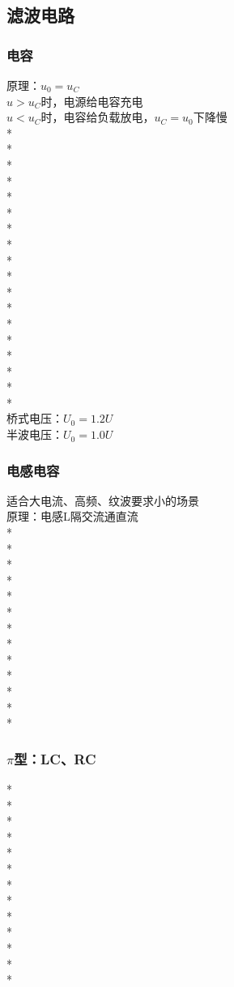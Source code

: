 \documentclass[UTF8, fontset=none]{ctexart}
\begin{document}
\begin{multicols*}{8}
\subsection{滤波电路}
\subsubsection{电容}
原理：$u_0 = u_C$\\
$u > u_C$时，电源给电容充电\\
$u < u_C$时，电容给负载放电，$u_C = u_0$下降慢\\
*\\
*\\
*\\
*\\
*\\
*\\
*\\
*\\
*\\
*\\
*\\
*\\
*\\
*\\
*\\
*\\
*\\
*\\
桥式电压：$U_0 = 1.2U$\\
半波电压：$U_0 = 1.0U$\\
\subsubsection{电感电容}
适合大电流、高频、纹波要求小的场景\\
原理：电感L隔交流通直流\\
*\\
*\\
*\\
*\\
*\\
*\\
*\\
*\\
*\\
*\\
*\\
*\\
*
\subsubsection{$\pi $型：LC、RC}
*\\
*\\
*\\
*\\
*\\
*\\
*\\
*\\
*\\
*\\
*\\
*\\
*

\end{multicols*}
\end{document}
